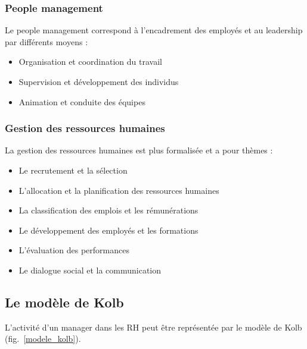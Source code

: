 \documentclass[12pt]{article}
\begin{document}
    \subsubsection{People management}
      Le people management correspond à l'encadrement des employés et au leadership par différents moyens :
      
      \begin{itemize}
       \item Organisation et coordination du travail
       \item Supervision et développement des individus
       \item Animation et conduite des équipes
      \end{itemize}
    
    \subsubsection{Gestion des ressources humaines}
      
      La gestion des ressources humaines est plus formalisée et a pour thèmes :
      
      \begin{itemize}
       \item Le recrutement et la sélection
       \item L'allocation et la planification des ressources humaines
       \item La classification des emplois et les rémunérations
       \item Le développement des employés et les formations
       \item L'évaluation des performances
       \item Le dialogue social et la communication
      \end{itemize}
      
  \subsection{Le modèle de Kolb}
  
  L'activité d'un manager dans les RH peut être représentée par le modèle de Kolb (fig.~\ref{modele_kolb}).
  
\end{document}
